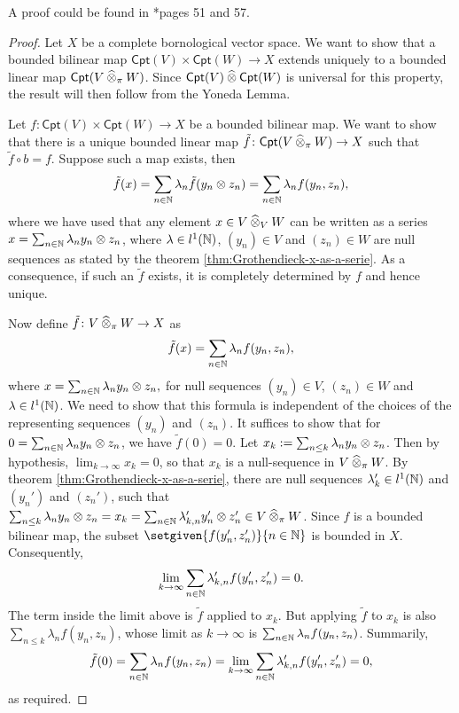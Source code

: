A proof could be found in \cite{grothendieck}*{pages 51 and 57}.

\begin{proof}
Let \(X\) be a complete bornological vector space. We want to show that a bounded bilinear map \(\mathsf{Cpt}(V) \times \mathsf{Cpt}(W) \to X\) extends uniquely to a bounded linear map \(\mathsf{Cpt}(V \mathbin{\widehat{\otimes}}_{\pi} W)\). Since \(\mathsf{Cpt}(V) \mathbin{\widehat{\otimes}} \mathsf{Cpt}(W)\) is universal for this property, the result will then follow from the Yoneda Lemma. 

Let \(f\colon \mathsf{Cpt}(V) \times \mathsf{Cpt}(W) \to X\) be a bounded bilinear map. We want to show that there is a unique bounded linear map \(\tilde{f}\colon \mathsf{Cpt}(V \mathbin{\widehat{\otimes}}_{\pi} W) \to X\) such that \(\tilde{f} \circ b = f\). Suppose such a map exists, then 
\[\tilde{f}(x) = \sum_{n \in \mathbb N} \lambda_n \tilde{f}(y_n \otimes  z_n) = \sum_{n \in \mathbb N} \lambda_n f(y_n, z_n),\] where we have used that any element \(x \in V \mathbin{\widehat{\otimes}}_{V} W\) can be written as a series \(x = \sum_{n \in \mathbb N} \lambda_n y_n \otimes z_n\), where \(\lambda \in l^1(\mathbb N)\), \((y_n) \in V\) and \((z_n) \in W\) are null sequences as stated by the theorem \ref{thm:Grothendieck-x-as-a-serie}. As a consequence, if such an \(\tilde{f}\) exists, it is completely determined by \(f\) and hence unique. 

Now define \(\tilde{f} \colon V \mathbin{\widehat{\otimes}}_{\pi} W \to X\) as \[\tilde{f}(x) = \sum_{n \in \mathbb N} \lambda_n f(y_n,z_n),\] where \(x = \sum_{n \in \mathbb N} \lambda_n y_n \otimes z_n,\) for null sequences \((y_n) \in V\), \((z_n) \in W\) and \(\lambda \in l^1(\mathbb N)\). We need to show that this formula is independent of the choices of the representing sequences \((y_n)\) and \((z_n)\). It suffices to show that for \(0 = \sum_{n \in \mathbb N} \lambda_n y_n \otimes z_n\), we have \(\tilde{f}(0) = 0\). Let \(x_k \mathrel{:=} \sum_{n \leq k} \lambda_n y_n \otimes z_n\).  Then by hypothesis, \(\lim_{k \to \infty} x_k = 0\), so that \(x_k\) is a null-sequence in \(V \mathbin{\widehat{\otimes}}_{\pi} W\). By theorem  \ref{thm:Grothendieck-x-as-a-serie}, there are null sequences \(\lambda_{k}' \in l^1(\mathbb N)\) and \((y_n')\) and \((z_n')\), such that \(\sum_{n \leq k} \lambda_n y_n \otimes z_n = x_k = \sum_{n \in \mathbb N}\lambda_{k,n}' y_n' \otimes z_n' \in V \mathbin{\widehat{\otimes}}_{\pi} W\). Since \(f\) is a bounded bilinear map, the subset \(\setgiven{f(y_n',z_n')}{n \in \N}\) is bounded in \(X\). Consequently, \[\lim_{k \to \infty} \sum_{n \in \mathbb N} \lambda_{k,n}' f(y_n',z_n') = 0.\] The term inside the limit above is \(\tilde{f}\) applied to \(x_k\). But applying \(\tilde{f}\) to \(x_k\) is also \(\sum_{n \leq k} \lambda_n f(y_n, z_n)\), whose limit as \(k \to \infty\) is \(\sum_{n \in \mathbb N} \lambda_n f(y_n, z_n)\). Summarily, \[\tilde{f}(0) = \sum_{n \in \mathbb N} \lambda_n f(y_n,z_n) = \lim_{k \to \infty} \sum_{n \in \mathbb N} \lambda_{k,n}'f(y_n', z_n') = 0,\] as required. 


\end{proof}
